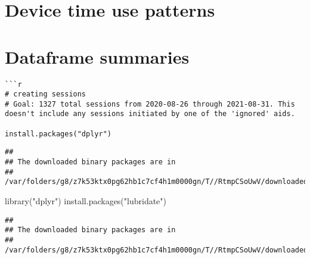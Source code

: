 \documentclass[
]{article}
\newenvironment{Shaded}{\begin{snugshade}}{\end{snugshade}}
\newcommand{\FunctionTok}[1]{\textcolor[rgb]{0.00,0.00,0.00}{#1}}
\newcommand{\NormalTok}[1]{#1}
\newcommand{\StringTok}[1]{\textcolor[rgb]{0.31,0.60,0.02}{#1}}
\begin{document}
\hypertarget{device-time-use-patterns}{%
\section{Device time use patterns}\label{device-time-use-patterns}}

\hypertarget{dataframe-summaries}{%
\section{Dataframe summaries}\label{dataframe-summaries}}

\begin{verbatim}
```r
# creating sessions 
# Goal: 1327 total sessions from 2020-08-26 through 2021-08-31. This doesn't include any sessions initiated by one of the 'ignored' aids.

install.packages("dplyr")
\end{verbatim}

\begin{verbatim}
## 
## The downloaded binary packages are in
##  /var/folders/g8/z7k53ktx0pg62hb1c7cf4h1m0000gn/T//RtmpCSoUwV/downloaded_packages
\end{verbatim}

\begin{Shaded}
\begin{Highlighting}[]
\FunctionTok{library}\NormalTok{(}\StringTok{"dplyr"}\NormalTok{)}
\FunctionTok{install.packages}\NormalTok{(}\StringTok{"lubridate"}\NormalTok{)}
\end{Highlighting}
\end{Shaded}

\begin{verbatim}
## 
## The downloaded binary packages are in
##  /var/folders/g8/z7k53ktx0pg62hb1c7cf4h1m0000gn/T//RtmpCSoUwV/downloaded_packages
\end{verbatim}
\end{document}
